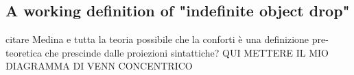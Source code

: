 \subsection{A working definition of "indefinite object drop"}

citare Medina e tutta la teoria possibile che la conforti
è una definizione pre-teoretica che prescinde dalle proiezioni sintattiche?
QUI METTERE IL MIO DIAGRAMMA DI VENN CONCENTRICO


